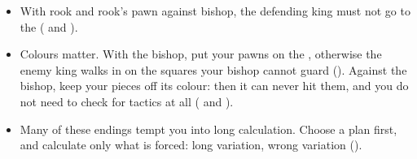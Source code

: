 \begin{itemize}
\item With rook and rook's pawn against bishop, the defending king must not go to the
 (
and ).

\item Colours matter. With the bishop, put your pawns on the
,
otherwise the enemy king walks in on the squares your bishop cannot guard
(). Against the bishop, keep your pieces off its
colour: then it can never hit them,
and you do not need to check for tactics at all ( and
).

\item Many of these endings tempt you into long calculation. Choose a plan first, and calculate
only what is forced: long variation, wrong
variation ().
\end{itemize}
